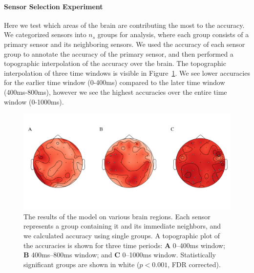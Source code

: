 \paragraph{Sensor Selection Experiment} Here we test which areas of the brain are contributing the most to the \tvt accuracy. We categorized sensors into $n_s$ groups for analysis, where each group consists of a primary sensor and its neighboring sensors. We used the accuracy of each sensor group to annotate the accuracy of the primary sensor, and then performed a topographic interpolation of the \tvt accuracy over the brain. The topographic interpolation of three time windows is visible in Figure~\ref{fig:topographic}. We see lower \tvt accuracies for the earlier time window (0-400ms) compared to the later time window (400ms-800ms), however we see the highest accuracies over the entire time window (0-1000ms).

\begin{figure}[t]
  \centering
  \includegraphics[width=0.9\linewidth]{figures/topographic}
  \caption{The results of the model on various brain regions. Each sensor represents a group containing it and its immediate neighbors, and we calculated \tvt accuracy using single groups.  A topographic plot of the \tvt accuracies is shown for three time periods: {\bf A}  0--400ms window; {\bf B} 400ms--800ms window; and {\bf C} 0--1000ms window. Statistically significant groups are shown in white ($p < 0.001$, FDR corrected).}
  \label{fig:topographic}
\end{figure}

